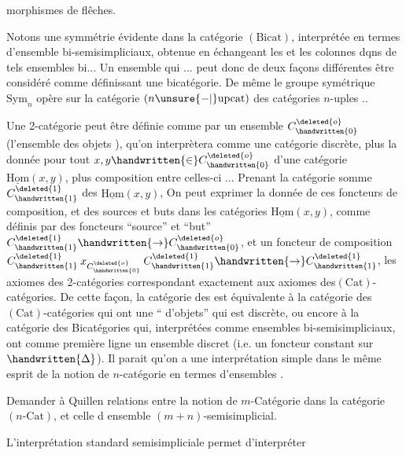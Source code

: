 
morphismes de flêches.

Notons une symmétrie évidente dans la catégorie $(\mathrm{Bicat})$, interprétée en termes d'ensemble bi-semisimpliciaux, obtenue en échangeant les  et les colonnes dqns  de tels ensembles bi... Un ensemble  qui ... peut donc de deux façons différentes être considéré comme définissant une bicatégorie. De même le groupe symétrique $\mathrm{Sym}_n$ opère sur la catégorie  $(n\unsure{-|{}}\mathrm{upcat})$ des catégories $n$-uples ..

Une 2-catégorie peut être définie comme  par un ensemble  $C^{\deleted{o}}_{\handwritten{0}}$ (l'ensemble des objets ), qu'on interprètera comme une catégorie discrète, plus la donnée pour tout $x,y\handwritten{\in}C^{\deleted{o}}_{\handwritten{0}}$ d'une catégorie $\underline{\mathrm{Hom}}(x,y)$, plus   composition entre celles-ci ... Prenant la catégorie somme  $C^{\deleted{1}}_{\handwritten{1}}$ des $\underline{\mathrm{Hom}}(x,y)$, On peut exprimer la donnée de ces foncteurs de composition, et des sources et buts  dans les catégories $\underline{\mathrm{Hom}}(x,y)$, comme définis par des foncteurs ``source'' et ``but'' $C^{\deleted{1}}_{\handwritten{1}}\handwritten{\to}C^{\deleted{o}}_{\handwritten{0}}$, et un foncteur de composition $C^{\deleted{1}}_{\handwritten{1}}\mathbin{x}_{C^{\deleted{o}}_{\handwritten{0}}}C^{\deleted{1}}_{\handwritten{1}}\handwritten{\to}C^{\deleted{1}}_{\handwritten{1}}$, les axiomes des 2-catégories correspondant exactement aux axiomes des$(\mathrm{Cat})$-catégories. De cette façon, la catégorie des  est équivalente à la catégorie des $(\mathrm{Cat})$-catégories qui ont une `` d'objets'' qui est discrète, ou encore à la catégorie des Bicatégories qui, interprétées comme ensembles bi-semisimpliciaux, ont  comme première ligne un ensemble  discret (i.e. un foncteur constant sur $\handwritten{\Delta}$). Il parait qu'on a une interprétation simple dans le même esprit de la notion de $n$-catégorie en termes d'ensembles .

\margin{\handwritten{\(\Vert\)}}%
 Demander à Quillen relations entre la notion de $m$-Catégorie dans la catégorie $(n\text{-}\mathrm{Cat})$, et celle d ensemble $(m+n)$-semisimplicial. 

L'interprétation standard semisimpliciale permet d'interpréter

